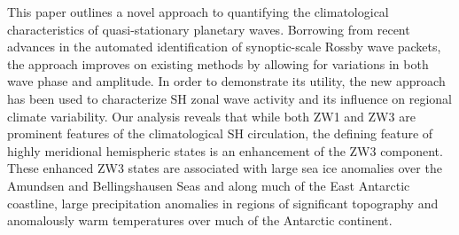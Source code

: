 
This paper outlines a novel approach to quantifying the climatological characteristics of quasi-stationary planetary waves. Borrowing from recent advances in the automated identification of synoptic-scale Rossby wave packets, the approach improves on existing methods by allowing for variations in both wave phase and amplitude. In order to demonstrate its utility, the new approach has been used to characterize SH zonal wave activity and its influence on regional climate variability. Our analysis reveals that while both ZW1 and ZW3 are prominent features of the climatological SH circulation, the defining feature of highly meridional hemispheric states is an enhancement of the ZW3 component. These enhanced ZW3 states are associated with large sea ice anomalies over the Amundsen and Bellingshausen Seas and along much of the East Antarctic coastline, large precipitation anomalies in regions of significant topography and anomalously warm temperatures over much of the Antarctic continent. 
